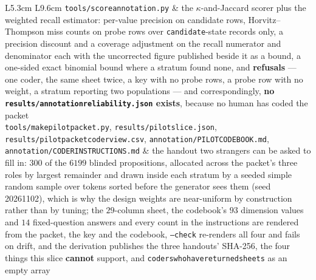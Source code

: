 \documentclass[11pt]{article}
\DeclareRobustCommand{\_}{\textunderscore\allowbreak}
\begin{document}
\begin{longtable}{L{5.3cm} L{9.6cm}}
\texttt{tools/score\_annotation.py} & the \(\kappa\)-and-Jaccard scorer plus the weighted recall estimator: per-value precision on candidate rows, Horvitz--Thompson miss counts on probe rows over \texttt{candidate}-state records only, a precision discount and a coverage adjustment on the recall numerator and denominator each with the uncorrected figure published beside it as a bound, a one-sided exact binomial bound where a stratum found none, and \textbf{refusals} --- one coder, the same sheet twice, a key with no probe rows, a probe row with no weight, a stratum reporting two populations --- and correspondingly, \textbf{no \texttt{results/annotation\_reliability.json} exists}, because no human has coded the packet \\
\texttt{tools/make\_pilot\_packet.py}, \texttt{results/pilot\_slice.json}, \texttt{results/pilot\_packet\_coder\_view.csv}, \texttt{annotation/PILOT\_CODEBOOK.md}, \texttt{annotation/CODER\_INSTRUCTIONS.md} & the handout two strangers can be asked to fill in: \(300\) of the \(6199\) blinded propositions, allocated across the packet's three roles by largest remainder and drawn inside each stratum by a seeded simple random sample over tokens sorted before the generator sees them (seed 20261102), which is why the design weights are near-uniform by construction rather than by tuning; the \(29\)-column sheet, the codebook's \(93\) dimension values and \(14\) fixed-question answers and every count in the instructions are rendered from the packet, the key and the codebook, \texttt{--check} re-renders all four and fails on drift, and the derivation publishes the three handouts' SHA-256, the four things this slice \textbf{cannot} support, and \texttt{coders\_who\_have\_returned\_sheets} as an empty array \\
\midrule
{}\\

\end{longtable}
\end{document}
